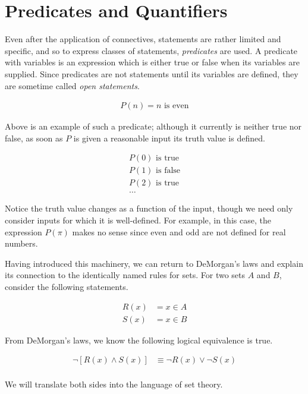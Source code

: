 \documentclass[twoside]{report}
\begin{document}
\section{Predicates and Quantifiers}

Even after the application of connectives, statements are rather limited and specific, and so to express classes of statements, \emph{predicates}  are used. A predicate with variables is an expression which is either true or false when its variables are supplied. Since predicates are not statements until its variables are defined, they are sometime called \emph{open statements}.

\begin{align*}
	P(n) = n \text{ is even}
\end{align*}

Above is an example of such a predicate; although it currently is neither true nor false, as soon as $P$ is given a reasonable input its truth value is defined.

\begin{align*}
	P(0) \text{ is true} \\
	P(1) \text{ is false} \\
	P(2) \text{ is true} \\
	\dots
\end{align*}

Notice the truth value changes as a function of the input, though we need only consider inputs for which it is well-defined. For example, in this case, the expression $P(\pi)$ makes no sense since even and odd are not defined for real numbers.

Having introduced this machinery, we can return to DeMorgan's laws and explain its connection to the identically named rules for sets. For two sets $A$ and $B$, consider the following statements.

\begin{align*}
	R(x) &= x \in A \\
	S(x) &= x \in B
\end{align*}

From DeMorgan's laws, we know the following logical equivalence is true.

\begin{align*}
	\neg[R(x) \wedge S(x)] &\equiv \neg R(x) \lor \neg S(x) \\
\end{align*}

We will translate both sides into the language of set theory.
 
\end{document}
